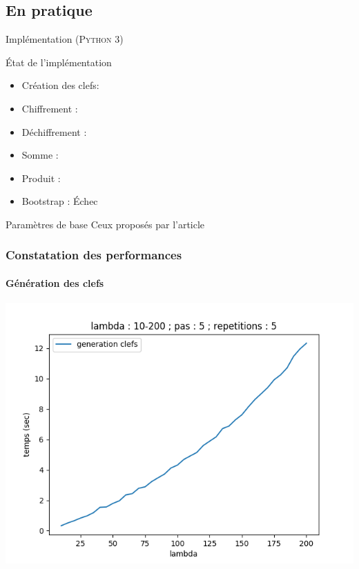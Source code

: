 \subsection{En pratique}

\begin{frame}{Implémentation (\textsc{Python 3})}
    \begin{alertblock}{État de l'implémentation}
    \begin{itemize}
    \item Création des clefs: \checked
    \item Chiffrement : \checked
    \item Déchiffrement : \checked
    \item Somme : \checked
    \item Produit : \checked
    \item Bootstrap : Échec
\end{itemize}
    \end{alertblock}{}
    
    \begin{alertblock}{Paramètres de base}
    Ceux proposés par l'article
    \end{alertblock}{}
\end{frame}


\begin{frame}
\frametitle{Constatation des performances}
\framesubtitle{Génération des clefs}
\begin{center}
\includegraphics[scale=0.46]{images/generation_clefs.png} 
\end{center}
\end{frame}

